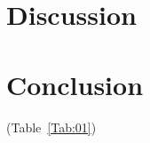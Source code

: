 \documentclass{bioinfo}
\begin{document}
\section{Discussion}




















%
%






\section{Conclusion}

(Table~\ref{Tab:01}) 








\end{document}

